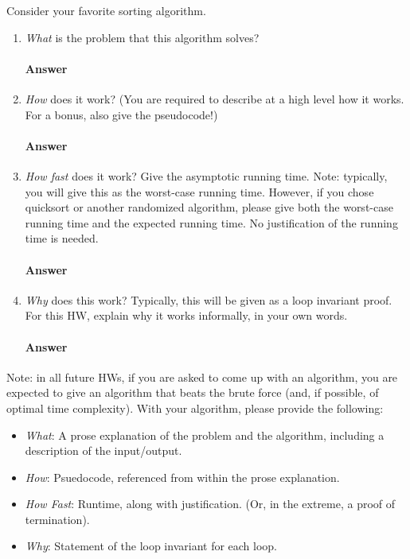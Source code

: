 \documentclass{article}
\begin{document}
\collab{\todo{}}
Consider your favorite sorting algorithm.
\begin{enumerate}
    \item \emph{What} is the problem that this algorithm solves?

        \paragraph{Answer}
        \todo{}

    \item \emph{How} does it work? (You are required to describe at a high level
        how it works.  For a bonus, also give the pseudocode!)

        \paragraph{Answer}
        \todo{}

    \item \emph{How fast} does it work?  Give the asymptotic running time.
        Note: typically, you will give this as the worst-case running time.
        However, if you chose quicksort or another randomized algorithm, please
        give both the worst-case running time and the expected running time.  No
        justification of the running time is needed.

        \paragraph{Answer}
        \todo{}

    \item \emph{Why} does this work? Typically, this will be given as a loop
        invariant proof.  For this HW, explain why it works informally, in your
        own words.

        \paragraph{Answer}
        \todo{}

\end{enumerate}

Note: in all future HWs, if you are asked to come up with an algorithm, you are
expected to give an algorithm that beats the brute force (and, if possible, of
optimal time complexity). With your algorithm, please provide the following:
\begin{itemize}
    \item \emph{What}: A prose explanation of the problem and the algorithm,
        including a description of the input/output.
    \item \emph{How}: Psuedocode, referenced from within the prose explanation.
    \item \emph{How Fast}: Runtime, along with justification.  (Or, in the
        extreme, a proof of termination).
    \item \emph{Why}: Statement of the loop invariant for each loop.
\end{itemize}
\end{document}
